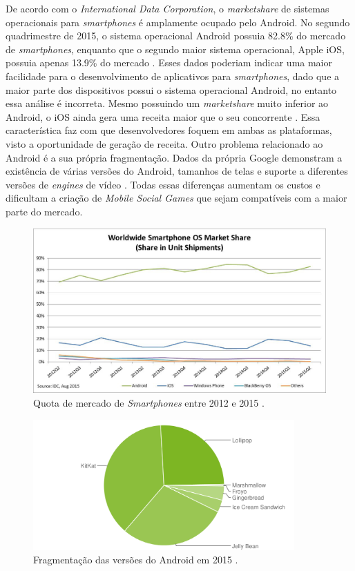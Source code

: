 De acordo com o \textit{International Data Corporation}, o \textit{marketshare} de sistemas operacionais para \textit{smartphones} é amplamente ocupado pelo Android. No segundo quadrimestre de 2015, o sistema operacional Android possuia 82.8\% do mercado de \textit{smartphones}, enquanto que o segundo maior sistema operacional, Apple iOS, possuia apenas 13.9\% do mercado \cite{idc}. Esses dados poderiam indicar uma maior facilidade para o desenvolvimento de aplicativos para \textit{smartphones}, dado que a maior parte dos dispositivos possui o sistema operacional Android, no entanto essa análise é incorreta. Mesmo possuindo um \textit{marketshare} muito inferior ao Android, o iOS ainda gera uma receita maior que o seu concorrente \cite{appAnnie}. Essa característica faz com que desenvolvedores foquem em ambas as plataformas, visto a oportunidade de geração de receita. Outro problema relacionado ao Android é a sua própria fragmentação. Dados da própria Google demonstram a existência de várias versões do Android, tamanhos de telas e suporte a diferentes versões de \textit{engines} de vídeo \cite{dashboardGoogle}. Todas essas diferenças aumentam os custos e dificultam a criação de \textit{Mobile Social Games} que sejam compatíveis com a maior parte do mercado.

\begin{figure}[h]
  \centering
  \includegraphics[width=12cm]{figuras/market_share}
  \caption{Quota de mercado de \textit{Smartphones} entre 2012 e 2015 \cite{idc}.}
  \label{figura:market_share}
\end{figure}

\begin{figure}[h]
  \centering
  \includegraphics[width=10cm]{figuras/android_chart}
  \caption{Fragmentação das versões do Android em 2015 \cite{dashboardGoogle}.}
  \label{figura:android_chart}
\end{figure}


